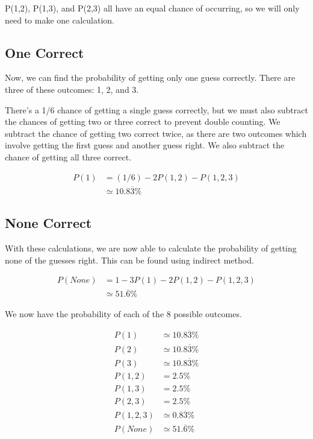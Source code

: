 \documentclass{article}
\begin{document}
{\vspace{2ex}
P(1,2), P(1,3), and P(2,3) all have an equal chance of occurring, so we will only need to make one calculation.

\vspace{2ex}
\subsection{One Correct}
{

Now, we can find the probability of getting only one guess correctly. There are three of these outcomes: 1, 2, and 3. 

\vspace{2ex}

There’s a 1/6 chance of getting a single guess correctly, but we must also subtract the chances of getting two or three correct to prevent double counting. We subtract the chance of getting two correct twice, as there are two outcomes which involve getting the first guess and another guess right. We also subtract the chance of getting all three correct.

\begin{equation}
    \begin{split}
        P(1) &= (1/6) - 2P(1,2) - P(1,2,3)\\
        &\simeq 10.8\overline{3}\%
    \end{split}
\end{equation}
}

\subsection{None Correct}
{
With these calculations, we are now able to calculate the probability of getting none of the guesses right. This can be found using indirect method.

\begin{equation}
    \begin{split}
        P(None) &= 1 - 3P(1) - 2P(1,2) - P(1,2,3)\\
        &\simeq 51.\overline{6}\%
    \end{split}
\end{equation}
}
\vspace{2ex}
We now have the probability of each of the 8 possible outcomes.

\begin{equation}
    \begin{split}
        P(1) &\simeq 10.8\overline{3}\% \\
        P(2) &\simeq 10.8\overline{3}\% \\
        P(3) &\simeq 10.8\overline{3}\% \\
        P(1,2) &= 2.5\% \\
        P(1,3) &= 2.5\% \\
        P(2,3) &= 2.5\% \\
        P(1,2,3) &\simeq 0.8\overline{3}\% \\
        P(None) &\simeq 51.\overline{6}\% \\
    \end{split}
\end{equation}
}
\end{document}
